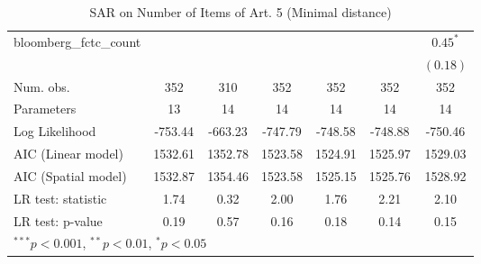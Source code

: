 \begin{table}[!h]
\begin{center}
\begin{tabular}{l c c c c c c }
bloomberg\_fctc\_count  &              &              &              &              &              & $0.45^{*}$   \\
                        &              &              &              &              &              & $(0.18)$     \\
\midrule
Num. obs.               & 352          & 310          & 352          & 352          & 352          & 352          \\
Parameters              & 13           & 14           & 14           & 14           & 14           & 14           \\
Log Likelihood          & -753.44      & -663.23      & -747.79      & -748.58      & -748.88      & -750.46      \\
AIC (Linear model)      & 1532.61      & 1352.78      & 1523.58      & 1524.91      & 1525.97      & 1529.03      \\
AIC (Spatial model)     & 1532.87      & 1354.46      & 1523.58      & 1525.15      & 1525.76      & 1528.92      \\
LR test: statistic      & 1.74         & 0.32         & 2.00         & 1.76         & 2.21         & 2.10         \\
LR test: p-value        & 0.19         & 0.57         & 0.16         & 0.18         & 0.14         & 0.15         \\
\bottomrule
\multicolumn{7}{l}{\scriptsize{$^{***}p<0.001$, $^{**}p<0.01$, $^*p<0.05$}}
\end{tabular}
\caption{SAR on Number of Items of Art. 5 (Minimal distance)}
\label{table:coefficients}
\end{center}
\end{table}
